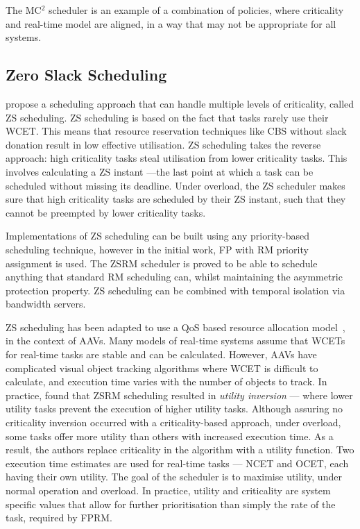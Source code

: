 The MC$^2$ scheduler is an example of a combination of policies, where criticality and real-time
model are aligned, in a way that may not be appropriate for all systems.

\subsection{Zero Slack Scheduling}
\label{s:zero-slack-scheduling}

 propose a scheduling approach that can handle multiple levels of criticality,
called \gls{ZS} scheduling. \gls{ZS} scheduling is based on the fact that tasks rarely use their
\gls{WCET}.  This means that resource reservation techniques like \gls{CBS} without slack donation
result in low effective utilisation.  ZS scheduling takes the reverse approach: high criticality
tasks steal utilisation from lower criticality tasks.  This involves calculating a \gls{ZS} instant
---the last point at which a task can be scheduled without missing its deadline.  Under overload, the
\gls{ZS} scheduler makes sure that high criticality tasks are scheduled by their \gls{ZS} instant,
such that they cannot be preempted by lower criticality tasks.

Implementations of \gls{ZS} scheduling can be built using any priority-based scheduling technique,
however in the initial work, \gls{FP} with \gls{RM} priority assignment is used.  The
\gls{ZS}\gls{RM} scheduler is proved to be able to schedule anything that standard \gls{RM}
scheduling can, whilst maintaining the asymmetric protection property.  \gls{ZS} scheduling can be
combined with temporal isolation via bandwidth servers.

\gls{ZS} scheduling has been adapted to use a \gls{QoS} based resource allocation
model~\citep{deNiz_WSRR_12}, in the context of \glspl{AAV}. Many models of real-time systems assume
that \glspl{WCET} for real-time tasks are stable and can be calculated.  However, \glspl{AAV} have
complicated visual object tracking algorithms where \gls{WCET} is difficult to calculate, and
execution time varies with the number of objects to track.  In practice,  found
that \gls{ZS}\gls{RM} scheduling resulted in \emph{utility inversion} --- where lower utility tasks
prevent the execution of higher utility tasks.  Although assuring no criticality inversion occurred
with a criticality-based approach, under overload, some tasks offer more utility than others with
increased execution time.  As a result, the authors replace criticality in the algorithm with a
utility function.  Two execution time estimates are used for real-time tasks --- \gls{NCET} and
\gls{OCET}, each having their own utility.  The goal of the scheduler is to maximise utility, under
normal operation and overload. In practice, utility and criticality are system specific values that
allow for further prioritisation than simply the rate of the task, required by \gls{FPRM}.

